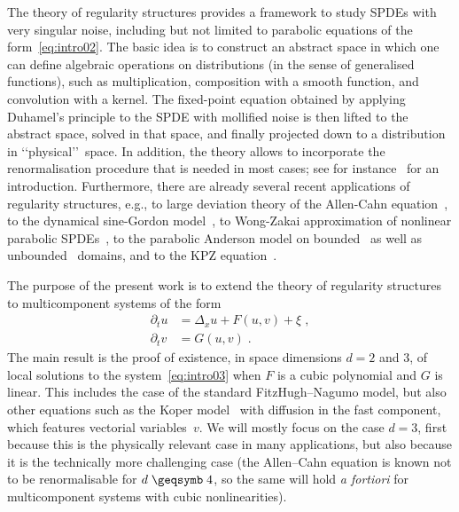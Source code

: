 \documentclass[reqno,11pt]{article}
\begin{document}
The theory of regularity structures provides a framework to study SPDEs with
very singular noise, including but not limited to parabolic equations of the
form~\eqref{eq:intro02}. The basic idea is to construct an abstract space in
which one can define algebraic operations on distributions (in the sense of
generalised functions), such as multiplication, composition with a smooth
function, and convolution with a kernel. The fixed-point equation obtained by
applying Duhamel's principle to the SPDE with mollified noise is then lifted to
the abstract space, solved in that space, and finally projected down to a
distribution in \lq\lq physical\rq\rq\ space. In addition, the theory allows to
incorporate the renormalisation procedure that is needed in most cases; see for
instance~\cite{Hairer_Ln_2013} for an introduction. Furthermore, there are
already several recent applications of regularity structures, e.g., to large
deviation theory of the Allen-Cahn equation~\cite{Hairer_Weber_15}, to the
dynamical sine-Gordon model~\cite{HairerShen14}, to Wong-Zakai approximation of
nonlinear parabolic SPDEs~\cite{HairerPardoux14}, to the parabolic Anderson
model on bounded~\cite{Hairer2014} as well as unbounded~\cite{HairerLabbe15}
domains, and to the KPZ equation~\cite{Hairer2014,Hairer2}. 

The purpose of the present work is to extend the theory of regularity structures
to multicomponent systems of the form
\begin{align}
\nonumber
\partial_t u &= \Delta_x u + F(u,v)+\xi\;, \\
\partial_t v &= G(u,v)\;.
\label{eq:intro03} 
\end{align}
The main result is the proof of existence, in space dimensions $d=2$ and $3$, of
local solutions to the system~\eqref{eq:intro03} when $F$ is a cubic
polynomial and $G$ is linear. This includes the case of the standard
FitzHugh--Nagumo model, but also other equations such as the Koper
model~\cite{Koper} with diffusion in the fast component, which features
vectorial variables~$v$. We will mostly focus on the case $d=3$, first because
this is the physically relevant case in many applications, but also because it
is the technically more challenging case (the Allen--Cahn equation is known not
to be renormalisable for $d\geqs4$, so the same will hold \textit{a fortiori}
for multicomponent systems with cubic nonlinearities). 
\end{document}
